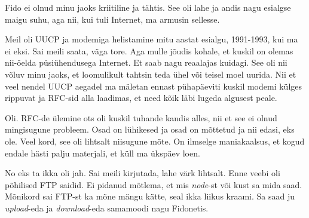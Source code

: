 
Fido ei olnud minu jaoks kriitiline ja tähtis. See oli lahe ja andis nagu 
esialgse maigu suhu, aga nii, kui tuli Internet, ma armusin sellesse.


Meil oli  UUCP ja modemiga helistamine mitu aastat esialgu, 1991-1993, kui ma 
ei eksi. Sai meili saata, väga tore. Aga mulle jõudis kohale, et kuskil on 
olemas nii-öelda püsiühendusega Internet. Et saab nagu reaalajas 
kuidagi. See oli nii võluv minu jaoks, et 
loomulikult tahtsin teda ühel või teisel moel uurida. Nii et veel nendel UUCP 
aegadel ma mäletan ennast pühapäeviti kuskil modemi külges rippuvat ja RFC-sid 
alla laadimas, et need kõik läbi lugeda algusest peale.


Oli. RFC-de ülemine ots oli kuskil tuhande kandis alles, nii et see ei olnud 
mingisugune probleem. Osad on lühikesed ja osad on mõttetud ja nii edasi, eks 
ole. Veel kord, see oli lihtsalt niisugune mõte. On ilmselge maniakaalsus, et 
kogud endale hästi palju materjali, et küll ma ükspäev loen.


No eks ta ikka oli jah. Sai meili kirjutada, lahe värk lihtsalt. Enne veebi oli 
põhilised FTP saidid. Ei pidanud mõtlema, et mis \emph{node}-st või kust sa 
mida saad.  Mõnikord sai FTP-st ka mõne mängu kätte, seal ikka liikus kraami. 
Sa saad ju \emph{upload}-eda ja \emph{download}-eda samamoodi nagu Fidonetis. 


